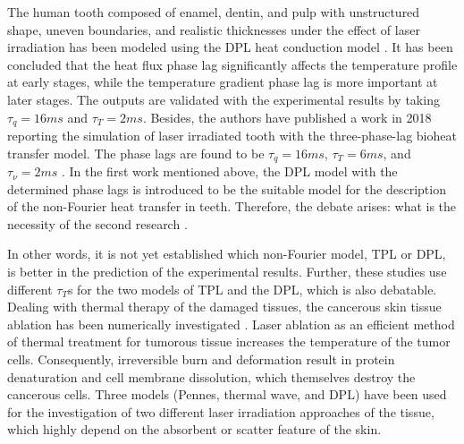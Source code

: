 \documentclass[sn-mathphys]{sn-jnl}%
\theoremstyle{thmstyleone}%
\theoremstyle{thmstyletwo}%
\theoremstyle{thmstylethree}%
\begin{document}
{The human tooth composed of enamel, dentin, and pulp with unstructured shape, uneven boundaries, and realistic thicknesses under the effect of laser irradiation has been modeled using the DPL heat conduction model \cite{SFalahatkar2017}. It has been concluded that the heat flux phase lag significantly affects the temperature profile at early stages, while the temperature gradient phase lag is more important at later stages. The outputs are validated with the experimental results by taking $\tau_{q}=16 ms$ and $\tau_{T}=2 ms$. Besides, the authors have published a work in 2018 reporting the simulation of laser irradiated tooth with the three-phase-lag bioheat transfer model. The phase lags are found to be $\tau_{q}=16 ms$, $\tau_{T}=6 ms$, and $\tau_{\nu}=2 ms$ \cite{Falahatkar2018}. In the first work mentioned above, the DPL model with the determined phase lags is introduced to be the suitable model for the description of the non-Fourier heat transfer in teeth. Therefore, the debate arises: what is the necessity of the second research \cite{Falahatkar2018}.

In other words, it is not yet established which non-Fourier model, TPL or DPL, is better in the prediction of the experimental results. Further, these studies use different $\tau_{T}$s for the two models of TPL and the DPL, which is also debatable. Dealing with thermal therapy of the damaged tissues, the cancerous skin tissue ablation has been numerically investigated \cite{Nobrega2017}. Laser ablation as an efficient method of thermal treatment for tumorous tissue increases the temperature of the tumor cells. Consequently, irreversible burn and deformation result in protein denaturation and cell membrane dissolution, which themselves destroy the cancerous cells. Three models (Pennes, thermal wave, and DPL) have been used for the investigation of two different laser irradiation approaches of the tissue, which highly depend on the absorbent or scatter feature of the skin.

}
\end{document}
